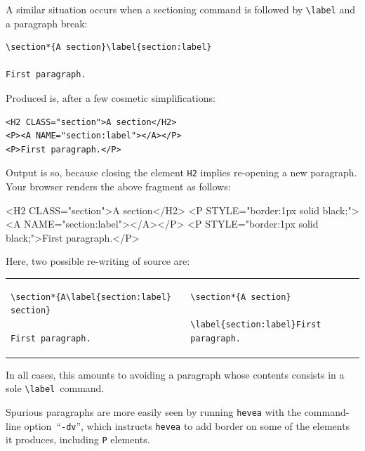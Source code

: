 A similar situation occurs when a sectioning command is followed by
\verb+\label+ and a paragraph break:
\begin{verbatim}
\section*{A section}\label{section:label}

First paragraph. 
\end{verbatim}
Produced \html{} is, after a few cosmetic simplifications:
\begin{verbatim}
<H2 CLASS="section">A section</H2>
<P><A NAME="section:label"></A></P>
<P>First paragraph.</P>
\end{verbatim}
Output is so, because closing the element \verb+H2+ implies re-opening
a new paragraph.
\ifhevea Your browser renders the above \html{} fragment as follows:
\begin{htmlout}%
\begin{rawhtml}
<H2 CLASS="section">A section</H2>
<P STYLE="border:1px solid black;"><A NAME="section:label"></A></P>
<P STYLE="border:1px solid black;">First paragraph.</P>
\end{rawhtml}%
\end{htmlout}%
\fi
Here, two possible re-writing of source are:
\begin{center}
\begin{tabular}{p{.45\linewidth}p{.45\linewidth}}
\begin{verbatim}
\section*{A\label{section:label} section}

First paragraph.
\end{verbatim}
&
\begin{verbatim}
\section*{A section}

\label{section:label}First paragraph.
\end{verbatim}
\end{tabular}
\end{center}
In all cases, this amounts to avoiding a paragraph whose contents
consists in a sole \verb+\label+~command.

Spurious paragraphs are more easily seen by running \texttt{hevea}
with the command-line option~``\texttt{-dv}'', which instructs
\texttt{hevea} to add border on some of the elements it produces,
including \verb+P+ elements.

